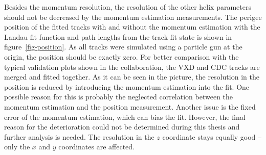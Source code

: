 Besides the momentum resolution, the resolution of the other helix parameters should not be decreased by the momentum estimation measurements. The perigee position of the fitted tracks with and without the momentum estimation with the Landau fit function and path lengths from the track fit state is shown in figure~\ref{fig-position}. As all tracks were simulated using a particle gun at the origin, the position should be exactly zero. For better comparison with the typical validation plots shown in the collaboration, the VXD and CDC tracks are merged and fitted together. As it can be seen in the picture, the resolution in the position is reduced by introducing the momentum estimation into the fit. One possible reason for this is probably the neglected correlation between the momentum estimation and the position measurement. Another issue is the fixed error of the momentum estimation, which can bias the fit. However, the final reason for the deterioration could not be determined during this thesis and further analysis is needed. The resolution in the $z$ coordinate stays equally good -- only the $x$ and $y$ coordinates are affected.

